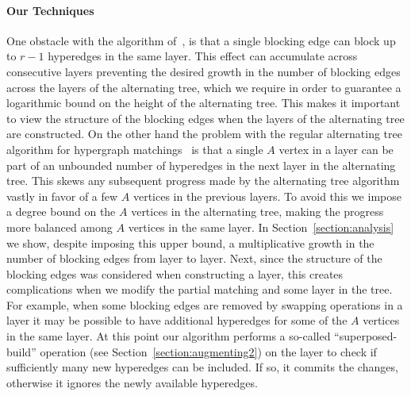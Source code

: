 \documentclass[11pt]{article}
\theoremstyle{definition}
\theoremstyle{remark}
\begin{document}
\paragraph{Our Techniques} One obstacle with the algorithm
of~\cite{DBLP:conf/soda/AnnamalaiKS15}, is that a single blocking edge
can block up to $r-1$ hyperedges in the same layer. This effect can
accumulate across consecutive layers preventing the desired growth in
the number of blocking edges across the layers of the alternating
tree, which we require in order to guarantee a logarithmic bound on
the height of the alternating tree. This makes it important to view
the structure of the blocking edges when the layers of the alternating
tree are constructed. On the other hand the problem with the regular
alternating tree algorithm for hypergraph
matchings~\cite{haxell1995condition} is that a single $A$ vertex in a
layer can be part of an unbounded number of hyperedges in the next
layer in the alternating tree. This skews any subsequent progress made
by the alternating tree algorithm vastly in favor of a few $A$
vertices in the previous layers. To avoid this we impose a degree
bound on the $A$ vertices in the alternating tree, making the progress
more balanced among $A$ vertices in the same layer. In
Section~\ref{section:analysis} we show, despite imposing this upper
bound, a multiplicative growth in the number of blocking edges from
layer to layer. Next, since the structure of the blocking edges was
considered when constructing a layer, this creates complications when
we modify the partial matching and some layer in the tree. For
example, when some blocking edges are removed by swapping operations
in a layer it may be possible to have additional hyperedges for some
of the $A$ vertices in the same layer. At this point our algorithm
performs a so-called ``superposed-build'' operation (see
Section~\ref{section:augmenting2}) on the layer to check if
sufficiently many new hyperedges can be included. If so, it commits
the changes, otherwise it ignores the newly available hyperedges.
\end{document}
